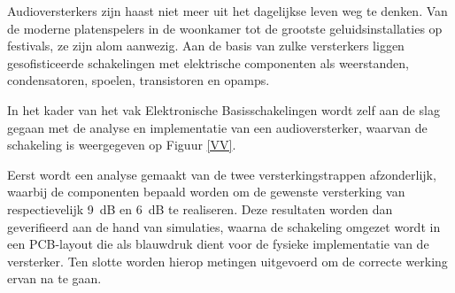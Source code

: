 \documentclass{report}
\begin{document}
Audioversterkers zijn haast niet meer uit het dagelijkse leven weg te denken. Van de moderne platenspelers in de woonkamer tot de grootste geluidsinstallaties op festivals, ze zijn alom aanwezig. Aan de basis van zulke versterkers liggen gesofisticeerde schakelingen met elektrische componenten als weerstanden, condensatoren, spoelen, transistoren en opamps.

In het kader van het vak Elektronische Basisschakelingen wordt zelf aan de slag gegaan met de analyse en implementatie van een audioversterker, waarvan de schakeling is weergegeven op Figuur \ref{VV}.

Eerst wordt een analyse gemaakt van de twee versterkingstrappen afzonderlijk, waarbij de componenten bepaald worden om de gewenste versterking van respectievelijk \SI{9}{\deci\bel} en \SI{6}{\deci\bel} te realiseren. Deze resultaten worden dan geverifieerd aan de hand van simulaties, waarna de schakeling omgezet wordt in een PCB-layout die als blauwdruk dient voor de fysieke implementatie van de versterker. Ten slotte worden hierop metingen uitgevoerd om de correcte werking ervan na te gaan.
\end{document}
